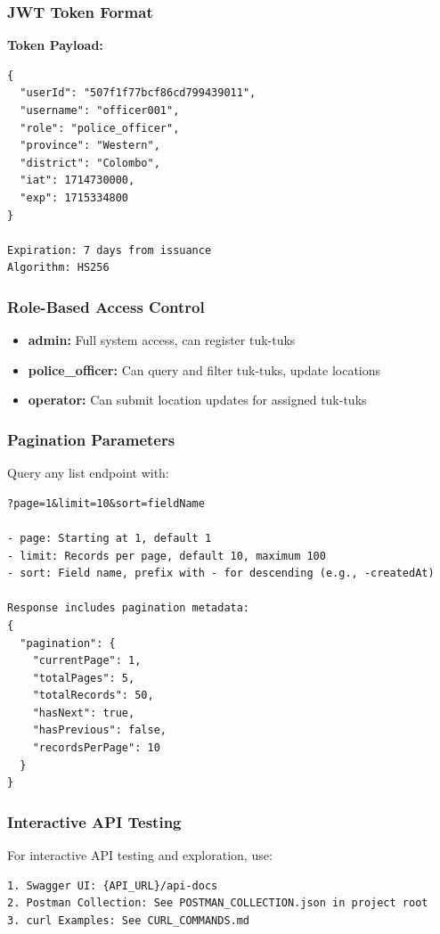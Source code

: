 \documentclass[12pt,a4paper]{article}
\begin{document}
\subsubsection*{JWT Token Format}

\textbf{Token Payload:}
\begin{verbatim}
{
  "userId": "507f1f77bcf86cd799439011",
  "username": "officer001",
  "role": "police_officer",
  "province": "Western",
  "district": "Colombo",
  "iat": 1714730000,
  "exp": 1715334800
}

Expiration: 7 days from issuance
Algorithm: HS256
\end{verbatim}

\subsubsection*{Role-Based Access Control}

\begin{itemize}
  \item \textbf{admin:} Full system access, can register tuk-tuks
  \item \textbf{police\_officer:} Can query and filter tuk-tuks, update locations
  \item \textbf{operator:} Can submit location updates for assigned tuk-tuks
\end{itemize}

\subsubsection*{Pagination Parameters}

Query any list endpoint with:
\begin{verbatim}
?page=1&limit=10&sort=fieldName

- page: Starting at 1, default 1
- limit: Records per page, default 10, maximum 100
- sort: Field name, prefix with - for descending (e.g., -createdAt)

Response includes pagination metadata:
{
  "pagination": {
    "currentPage": 1,
    "totalPages": 5,
    "totalRecords": 50,
    "hasNext": true,
    "hasPrevious": false,
    "recordsPerPage": 10
  }
}
\end{verbatim}

\subsubsection*{Interactive API Testing}

For interactive API testing and exploration, use:
\begin{verbatim}
1. Swagger UI: {API_URL}/api-docs
2. Postman Collection: See POSTMAN_COLLECTION.json in project root
3. curl Examples: See CURL_COMMANDS.md
\end{verbatim}
\end{document}
